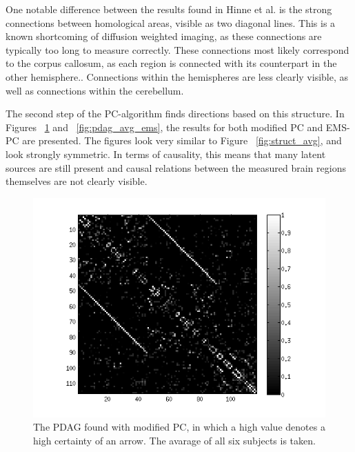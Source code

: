 \documentclass[a4paper, 10pt, english, onecolumn]{article}
\begin{document}
One notable difference between the results found in Hinne et al. is the strong connections between homological areas, visible as two diagonal lines.
This is a known shortcoming of diffusion weighted imaging, as these connections are typically too long to measure correctly.
These connections most likely correspond to the corpus callosum, as each region is connected with its counterpart in the other hemisphere..
Connections within the hemispheres are less clearly visible, as well as connections within the cerebellum.

The second step of the PC-algorithm finds directions based on this structure.
In Figures ~\ref{fig:pdag_avg_mod} and ~\ref{fig:pdag_avg_ems}, the results for both modified PC and EMS-PC are presented.
The figures look very similar to Figure ~\ref{fig:struct_avg}, and look strongly symmetric.
In terms of causality, this means that many latent sources are still present and causal relations between the measured brain regions themselves are not clearly visible.

\begin{figure}[h!]
  \centering
  \includegraphics{images/PDAG_avg_mod}
  \caption{The PDAG found with modified PC, in which a high value denotes a high certainty of an arrow. The avarage of all six subjects is taken.}
  \label{fig:pdag_avg_mod}
\end{figure}
\end{document}
